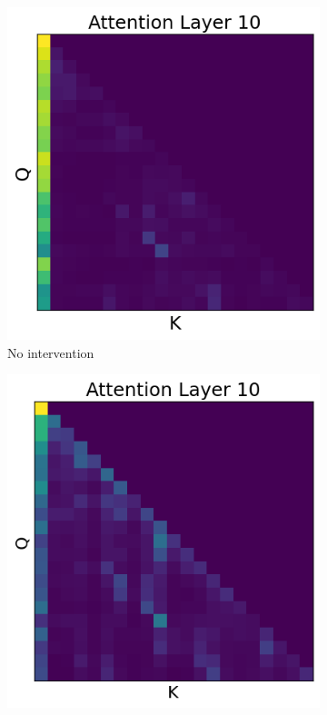 \documentclass[11pt]{article}
\begin{document}
\begin{figure}[t!]
  \centering
  \begin{subfigure}[t]{0.22\textwidth}
    \centering
    \includegraphics[width=0.86\linewidth]{figures/obs4_no_intervention.png}
    \caption{No intervention}
    \label{fig:no_intervention}
  \end{subfigure}
  \begin{subfigure}[t]{0.22\textwidth}
    \centering
    \includegraphics[width=0.86\linewidth]{figures/obs4_intervention1.png}

\end{subfigure}
\end{figure}
\end{document}
